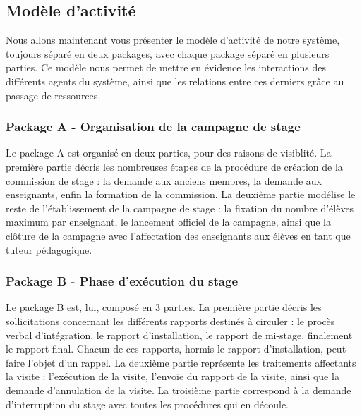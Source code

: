 \documentclass[12pt,a4paper]{article}
\begin{document}
\subsection{Modèle d'activité}

Nous allons maintenant vous présenter le modèle d'activité de notre système,
toujours séparé en deux packages, avec chaque package séparé en plusieurs
parties. Ce modèle nous permet de mettre en évidence les interactions des
différents agents du système, ainsi que les relations entre ces derniers grâce
au passage de ressources.

\subsubsection{Package A - Organisation de la campagne de stage}

Le package A est organisé en deux parties, pour des raisons de visiblité. La
première partie décris les nombreuses étapes de la procédure de création de la
commission de stage : la demande aux anciens membres, la demande aux
enseignants, enfin la formation de la commission. La deuxième partie modélise le
reste de l'établissement de la campagne de stage : la fixation du nombre
d'élèves maximum par enseignant, le lancement officiel de la campagne, ainsi que
la clôture de la campagne avec l'affectation des enseignants aux élèves en tant
que tuteur pédagogique.

{
    \newpage {} 
    
    \restoregeometry {} \newpage
}

{
    \newpage {} 
    
    \restoregeometry {} \newpage
}

\subsubsection{Package B - Phase d'exécution du stage}

Le package B est, lui, composé en 3 parties. La première partie décris les
sollicitations concernant les différents rapports destinés à circuler : le
procès verbal d'intégration, le rapport d'installation, le rapport de mi-stage,
finalement le rapport final. Chacun de ces rapports, hormis le rapport
d'installation, peut faire l'objet d'un rappel. La deuxième partie représente
les traitements affectants la visite : l'exécution de la visite, l'envoie du
rapport de la visite, ainsi que la demande d'annulation de la visite. La
troisième partie correspond à la demande d'interruption du stage avec toutes les
procédures qui en découle.
\end{document}
